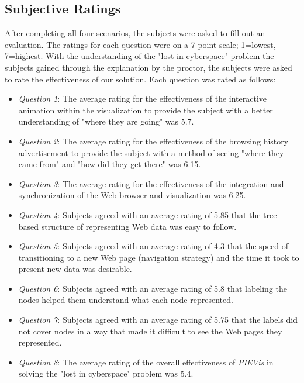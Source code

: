 \documentclass[]{article}
\begin{document}
{\subsection{Subjective Ratings}
\label{user_study_ratings}

After completing all four scenarios, the subjects were asked to fill out an evaluation.  The ratings for each question were on a 7-point scale; 1=lowest, 7=highest.
With the understanding of the "lost in cyberspace" problem the subjects gained through the explanation by the proctor, the subjects were asked to rate the effectiveness of our solution.
Each question was rated as follows:

\begin{itemize} 

\item {\em Question 1}: The average rating for the effectiveness of the interactive animation within the visualization to provide the subject with a better understanding of "where they are going" was 5.7.

\item {\em Question 2}: The average rating for the effectiveness of the browsing history advertisement to provide the subject with a method of seeing "where they came from" and "how did they get there" was 6.15.

\item {\em Question 3}: The average rating for the effectiveness of the integration and synchronization of the Web browser and visualization was 6.25.

\item {\em Question 4}: Subjects agreed with an average rating of 5.85 that the tree-based structure of representing Web data was easy to follow.

\item {\em Question 5}: Subjects agreed with an average rating of 4.3 that the speed of transitioning to a new Web page (navigation strategy) and the time it took to present new data was desirable.

\item {\em Question 6}: Subjects agreed with an average rating of 5.8 that labeling the nodes helped them understand what each node represented.

\item {\em Question 7}: Subjects agreed with an average rating of 5.75 that the labels did not cover nodes in a way that made it difficult to see the Web pages they represented.

\item {\em Question 8}: The average rating of the overall effectiveness of {\em PIEVis} in solving the "lost in cyberspace" problem was 5.4.


\end{itemize}}
\end{document}
